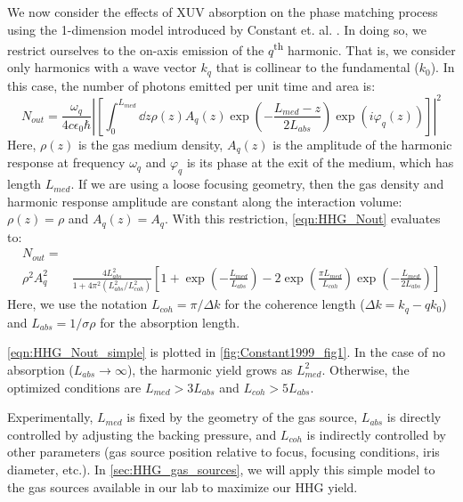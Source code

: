 We now consider the effects of XUV absorption on the phase matching process using the 1-dimension model introduced by Constant et. al. \cite{constantOptimizingHighHarmonic1999}. In doing so, we restrict ourselves to the on-axis emission of the $q$\textsuperscript{th} harmonic. That is, we consider only harmonics with a wave vector $k_q$ that is collinear to the fundamental ($k_0$). In this case, the number of photons emitted per unit time and area is:
\begin{equation}
N_{out} = \frac{\omega_q}{4 c \epsilon_0 \hbar} \left| \left[ \int_{0}^{L_{med}} \dd{z} \rho(z) A_q(z) \exp \left( - \frac{L_{med} - z}{2 L_{abs}}  \right) \exp \left( i \varphi_q(z) \right)  \right] \right|^2
\label{eqn:HHG_Nout}
\end{equation}
Here, $\rho(z)$ is the gas medium density, $A_q(z)$ is the amplitude of the harmonic response at frequency $\omega_q$ and $\varphi_q$ is its phase at the exit of the medium, which has length $L_{med}$. If we are using a loose focusing geometry, then the gas density and harmonic response amplitude are constant along the interaction volume: $\rho(z) = \rho$ and $A_q(z)=A_q$. With this restriction, \cref{eqn:HHG_Nout} evaluates to:
\begin{equation}
\begin{aligned}
N_{out} = & \\ \rho^2 A_q^2 & \frac{4L_{abs}^2}{1+4\pi^2(L_{abs}^2 / L_{coh}^2)} \left[ 1 + \exp\left(-\frac{L_{med}}{L_{abs}}\right) - 2 \exp\left(\frac{\pi L_{med}}{L_{coh}}\right) \exp\left(-\frac{L_{med}}{2L_{abs}}\right) \right]
\label{eqn:HHG_Nout_simple}
\end{aligned}
\end{equation}
Here, we use the notation $L_{coh} = \pi/\Delta k$ for the coherence length ($\Delta k = k_q - q k_0$) and $L_{abs} = 1/{\sigma \rho}$ for the absorption length.


\cref{eqn:HHG_Nout_simple} is plotted in \cref{fig:Constant1999_fig1}. In the case of no absorption ($L_{abs} \rightarrow \infty$), the harmonic yield grows as $L_{med}^2$. Otherwise, the optimized conditions are $L_{med} > 3 L_{abs}$ and $L_{coh} > 5 L_{abs}$.

Experimentally, $L_{med}$ is fixed by the geometry of the gas source, $L_{abs}$ is directly controlled by adjusting the backing pressure, and $L_{coh}$ is indirectly controlled by other parameters (gas source position relative to focus, focusing conditions, iris diameter, etc.). In \cref{sec:HHG_gas_sources}, we will apply this simple model to the gas sources available in our lab to maximize our HHG yield.

